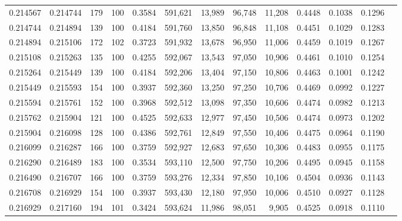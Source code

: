 \begin{tabular}{rrrrrrrrrrrrr}
0.214567 & 0.214744 &   179 & 100 &                                     0.3584 & 591,621 &  13,989 &  96,748 &  11,208 & 0.4448 & 0.1038 & 0.1296 \\
0.214744 & 0.214894 &   139 & 100 &                                     0.4184 & 591,760 &  13,850 &  96,848 &  11,108 & 0.4451 & 0.1029 & 0.1283 \\
0.214894 & 0.215106 &   172 & 102 &                                     0.3723 & 591,932 &  13,678 &  96,950 &  11,006 & 0.4459 & 0.1019 & 0.1267 \\
0.215108 & 0.215263 &   135 & 100 &                                     0.4255 & 592,067 &  13,543 &  97,050 &  10,906 & 0.4461 & 0.1010 & 0.1254 \\
0.215264 & 0.215449 &   139 & 100 &                                     0.4184 & 592,206 &  13,404 &  97,150 &  10,806 & 0.4463 & 0.1001 & 0.1242 \\
0.215449 & 0.215593 &   154 & 100 &                                     0.3937 & 592,360 &  13,250 &  97,250 &  10,706 & 0.4469 & 0.0992 & 0.1227 \\
0.215594 & 0.215761 &   152 & 100 &                                     0.3968 & 592,512 &  13,098 &  97,350 &  10,606 & 0.4474 & 0.0982 & 0.1213 \\
0.215762 & 0.215904 &   121 & 100 &                                     0.4525 & 592,633 &  12,977 &  97,450 &  10,506 & 0.4474 & 0.0973 & 0.1202 \\
0.215904 & 0.216098 &   128 & 100 &                                     0.4386 & 592,761 &  12,849 &  97,550 &  10,406 & 0.4475 & 0.0964 & 0.1190 \\
0.216099 & 0.216287 &   166 & 100 &                                     0.3759 & 592,927 &  12,683 &  97,650 &  10,306 & 0.4483 & 0.0955 & 0.1175 \\
0.216290 & 0.216489 &   183 & 100 &                                     0.3534 & 593,110 &  12,500 &  97,750 &  10,206 & 0.4495 & 0.0945 & 0.1158 \\
0.216490 & 0.216707 &   166 & 100 &                                     0.3759 & 593,276 &  12,334 &  97,850 &  10,106 & 0.4504 & 0.0936 & 0.1143 \\
0.216708 & 0.216929 &   154 & 100 &                                     0.3937 & 593,430 &  12,180 &  97,950 &  10,006 & 0.4510 & 0.0927 & 0.1128 \\
0.216929 & 0.217160 &   194 & 101 &                                     0.3424 & 593,624 &  11,986 &  98,051 &   9,905 & 0.4525 & 0.0918 & 0.1110 \\

\end{tabular}
